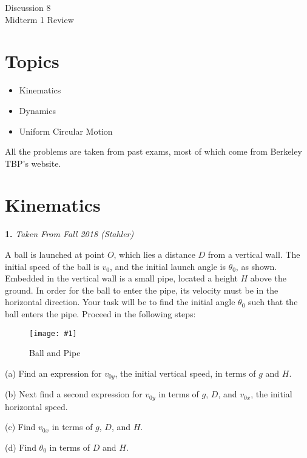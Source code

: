 \documentclass[11pt]{article}
\newcommand{\fig}[4]{
    \begin{figure}[H]
        \centering
        \texttt{[image: \#1]}
        \caption{#2}
        \label{exp4fit}
    \end{figure}
}
\theoremstyle{gangnamstyle}{\newtheorem{definition}{Definition}[]}
\theoremstyle{gangnamstyle}{\newtheorem{example}{Example}[]}
\theoremstyle{gangnamstyle}{\newtheorem{problem}{Problem}[]}
\begin{document}
\normalfont
\pagestyle{pages}


\begin{center}
\vspace{3in}
{\Large Discussion 8 } \\ [0.05in]
Midterm 1 Review \\ [-0.5in]
\end{center}

\section*{Topics}
\begin{itemize}
\item Kinematics
\item Dynamics
\item Uniform Circular Motion
\end{itemize}
All the problems are taken from past exams, most of which come from Berkeley TBP's website. 



\section{Kinematics}

\textbf{1.} \textit{Taken From Fall 2018 (Stahler)} 

A ball is launched at point $O$, which lies a distance $D$ from a vertical wall. The initial speed of the ball is $v_0$, and the initial launch angle is $\theta_0$, as shown. Embedded in the vertical wall is a small pipe, located a height $H$ above the ground. In order for the ball to enter the pipe, its velocity must be in the horizontal direction. Your task will be to find the initial angle $\theta_0$ such that the ball enters the pipe. Proceed in the following steps:

\fig{figs/0708/pipe.png}{Ball and Pipe}{0.4}{0} 

(a) Find an expression for $v_{0y}$, the initial vertical speed, in terms of $g$ and $H$. 

(b) Next find a second expression for $v_{0y}$ in terms of $g$, $D$, and $v_{0x}$, the initial horizontal speed. 

(c) Find $v_{0x}$ in terms of $g$, $D$, and $H$. 

(d) Find $\theta_0$ in terms of $D$ and $H$.

\pagebreak
\end{document}
